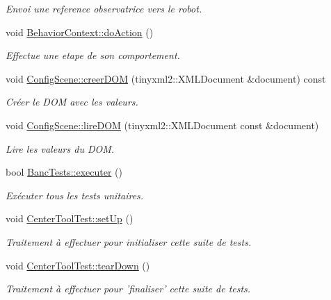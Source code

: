 \begin{DoxyCompactItemize}
\begin{DoxyCompactList}\small\item\em Envoi une reference observatrice vers le robot. \end{DoxyCompactList}\item 
\hypertarget{group__inf2990_ga2d15f4d9b398d9b3cb79f790dcf0187f}{void \hyperlink{group__inf2990_ga2d15f4d9b398d9b3cb79f790dcf0187f}{Behavior\-Context\-::do\-Action} ()}\label{group__inf2990_ga2d15f4d9b398d9b3cb79f790dcf0187f}

\begin{DoxyCompactList}\small\item\em Effectue une etape de son comportement. \end{DoxyCompactList}\item 
void \hyperlink{group__inf2990_ga3d0152df0c8c134ecd1a1741302db839}{Config\-Scene\-::creer\-D\-O\-M} (tinyxml2\-::\-X\-M\-L\-Document \&document) const 
\begin{DoxyCompactList}\small\item\em Créer le D\-O\-M avec les valeurs. \end{DoxyCompactList}\item 
void \hyperlink{group__inf2990_gaeacd60be947ce76a1302f6bbb40c90b1}{Config\-Scene\-::lire\-D\-O\-M} (tinyxml2\-::\-X\-M\-L\-Document const \&document)
\begin{DoxyCompactList}\small\item\em Lire les valeurs du D\-O\-M. \end{DoxyCompactList}\item 
bool \hyperlink{group__inf2990_gab5d7fbfe7e3fbe00aa187caa10b1c506}{Banc\-Tests\-::executer} ()
\begin{DoxyCompactList}\small\item\em Exécuter tous les tests unitaires. \end{DoxyCompactList}\item 
void \hyperlink{group__inf2990_gab5443e5a7c8e3ddcd5bac53be6663244}{Center\-Tool\-Test\-::set\-Up} ()
\begin{DoxyCompactList}\small\item\em Traitement à effectuer pour initialiser cette suite de tests. \end{DoxyCompactList}\item 
void \hyperlink{group__inf2990_ga837ac366aa728e8f9536e950b9da3769}{Center\-Tool\-Test\-::tear\-Down} ()
\begin{DoxyCompactList}\small\item\em Traitement à effectuer pour 'finaliser' cette suite de tests. \end{DoxyCompactList}\item 

\end{DoxyCompactItemize}
